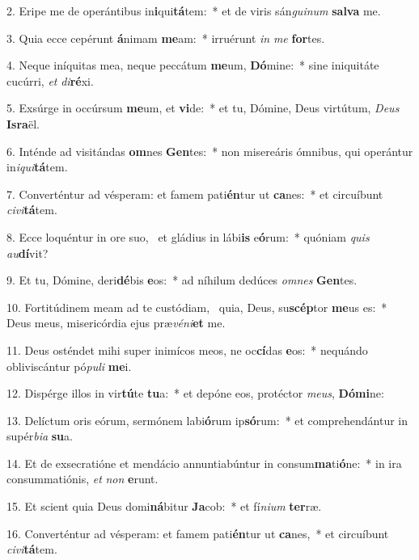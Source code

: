 2. Eripe me de operántibus in\textbf{i}qui\textbf{tá}tem:~*  et de viris sán\textit{gui}\textit{num} \textbf{sal}\textbf{va} me.\

3. Quia ecce cepérunt \textbf{á}nimam \textbf{me}am:~*  irruérunt \textit{in} \textit{me} \textbf{for}tes.\

4. Neque iníquitas mea, neque peccátum \textbf{me}um, \textbf{Dó}mine:~*  sine iniquitáte cucúrri, \textit{et} \textit{di}\textbf{ré}xi.\

5. Exsúrge in occúrsum \textbf{me}um, et \textbf{vi}de:~*  et tu, Dómine, Deus virtútum, \textit{De}\textit{us} \textbf{Is}\textbf{ra}ël.\

6. Inténde ad visitándas \textbf{om}nes \textbf{Gen}tes:~*  non misereáris ómnibus, qui operántur in\textit{i}\textit{qui}\textbf{tá}tem.\

7. Converténtur ad vésperam: et famem pati\textbf{én}tur ut \textbf{ca}nes:~*  et circuíbunt \textit{ci}\textit{vi}\textbf{tá}tem.\

8. Ecce loquéntur in ore suo, \dag\  et gládius in lábi\textbf{is} e\textbf{ó}rum:~*  quóniam \textit{quis} \textit{au}\textbf{dí}vit?\

9. Et tu, Dómine, deri\textbf{dé}bis \textbf{e}os:~*  ad níhilum dedúces \textit{om}\textit{nes} \textbf{Gen}tes.\

10. Fortitúdinem meam ad te custódiam, \dag\  quia, Deus, su\textbf{scép}tor \textbf{me}us es:~*  Deus meus, misericórdia ejus præ\textit{vé}\textit{ni}\textbf{et} me.\

11. Deus osténdet mihi super inimícos meos, ne oc\textbf{cí}das \textbf{e}os:~*  nequándo obliviscántur pó\textit{pu}\textit{li} \textbf{me}i.\

12. Dispérge illos in vir\textbf{tú}te \textbf{tu}a:~*  et depóne eos, protéctor \textit{me}\textit{us}, \textbf{Dó}\textbf{mi}ne:\

13. Delíctum oris eórum, sermónem labi\textbf{ó}rum ip\textbf{só}rum:~*  et comprehendántur in supér\textit{bi}\textit{a} \textbf{su}a.\

14. Et de exsecratióne et mendácio annuntiabúntur in consum\textbf{ma}ti\textbf{ó}ne:~*  in ira consummatiónis, \textit{et} \textit{non} \textbf{e}runt.\

15. Et scient quia Deus domi\textbf{ná}bitur \textbf{Ja}cob:~*  et fí\textit{ni}\textit{um} \textbf{ter}ræ.\

16. Converténtur ad vésperam: et famem pati\textbf{én}tur ut \textbf{ca}nes,~*  et circuíbunt \textit{ci}\textit{vi}\textbf{tá}tem.\

